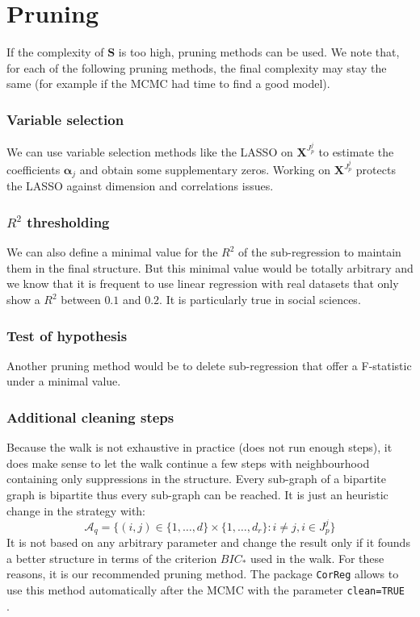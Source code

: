 \documentclass[12pt,a4paper]{report}
\begin{document}
	\section{Pruning}
		If the complexity of $\boldsymbol{S}$ is too high, pruning methods can be used. We note that, for each of the following pruning methods, the final complexity may stay the same (for example if the MCMC had time to find a good model).
		\subsubsection{Variable selection}
			We can use variable selection methods like the LASSO on $\boldsymbol{X}^{J_p^j}$ to estimate the coefficients $\boldsymbol{\alpha}_j$ and obtain some supplementary zeros. Working on $\boldsymbol{X}^{J_p^j}$ protects the LASSO against dimension and correlations issues.
		\subsubsection{$R^2$ thresholding }
			We can also define a minimal value for the $R^2$ of the sub-regression to maintain them in the final structure. But this minimal value would be totally arbitrary and we know that it is frequent to use linear regression with real datasets that only show a $R^2$ between $0.1$ and $0.2$. It is particularly true in social sciences.
		\subsubsection{Test of hypothesis}
			Another pruning method would be to delete sub-regression that offer a F-statistic under a minimal value.
		\subsubsection{Additional cleaning steps}
			Because the walk is not exhaustive in practice (does not run enough steps), it does make sense to let the walk continue a few steps with neighbourhood containing only suppressions in the structure. Every sub-graph of a bipartite graph is bipartite thus every sub-graph can be reached. It is just an heuristic change in the strategy with:
			\begin{equation}
				\mathcal{A}_q=\{(i,j) \in  \{1,\dots,d\}\times\{1,\dots,d_r\} :i \neq j, i \in J_p^j \}
			\end{equation}
			It is not based on any arbitrary parameter and change the result only if it founds a better structure in terms of the criterion $BIC_*$ used in the walk.
			For these reasons, it is our recommended pruning method. The package {\tt CorReg} allows to use this method automatically after the MCMC with the parameter {\tt clean=TRUE }.
			
\end{document}
